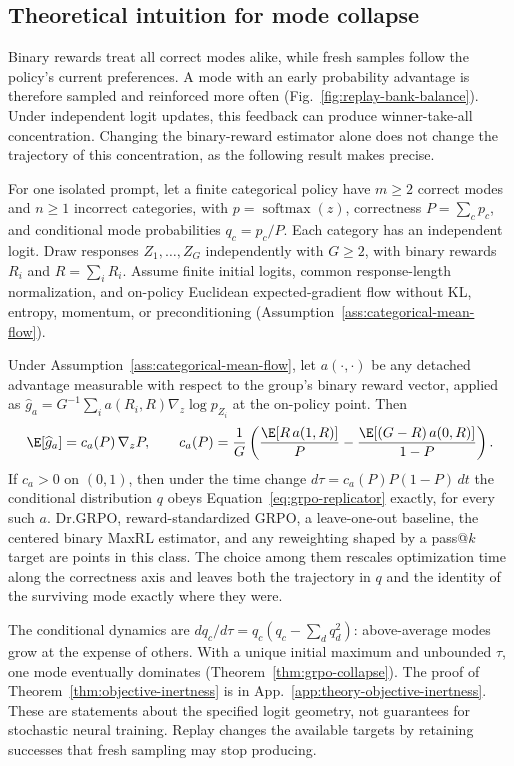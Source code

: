 \subsection{Theoretical intuition for mode collapse}
\label{sec:collapse-mechanism}

Binary rewards treat all correct modes alike, while fresh samples follow the policy's current preferences. A mode with an early probability advantage is therefore sampled and reinforced more often (Fig.~\ref{fig:replay-bank-balance}). Under independent logit updates, this feedback can produce winner-take-all concentration. Changing the binary-reward estimator alone does not change the trajectory of this concentration, as the following result makes precise.

For one isolated prompt, let a finite categorical policy have $m\ge2$ correct modes and $n\ge1$ incorrect categories, with $p=\operatorname{softmax}(z)$, correctness $P=\sum_c p_c$, and conditional mode probabilities $q_c=p_c/P$. Each category has an independent logit. Draw responses $Z_1,\ldots,Z_G$ independently with $G\ge2$, with binary rewards $R_i$ and $R=\sum_iR_i$. Assume finite initial logits, common response-length normalization, and on-policy Euclidean expected-gradient flow without KL, entropy, momentum, or preconditioning (Assumption~\ref{ass:categorical-mean-flow}).

\begin{theorem}
\label{thm:objective-inertness}
Under Assumption~\ref{ass:categorical-mean-flow}, let $a(\cdot,\cdot)$ be any
detached advantage measurable with respect to the group's binary reward
vector, applied as
$\widehat g_a=G^{-1}\sum_{i}a(R_i,R)\nabla_z\log p_{Z_i}$ at the on-policy
point. Then
\begin{equation}
  \E[\widehat g_a]=c_a(P)\,\nabla_zP,
  \qquad
  c_a(P)=\frac1G\left(
  \frac{\E[R\,a(1,R)]}{P}-\frac{\E[(G-R)\,a(0,R)]}{1-P}\right).
  \label{eq:objective-inertness}
\end{equation}
If $c_a>0$ on $(0,1)$, then under the time change
$d\tau=c_a(P)P(1-P)\,dt$ the conditional distribution $q$ obeys
Equation~\eqref{eq:grpo-replicator} exactly, for every such $a$. Dr.GRPO,
reward-standardized GRPO, a leave-one-out baseline, the centered binary MaxRL
estimator, and any reweighting shaped by a pass@$k$ target are points in this
class. The choice among them rescales optimization time along the correctness
axis and leaves both the trajectory in $q$ and the identity of the surviving
mode exactly where they were.
\end{theorem}

The conditional dynamics are $dq_c/d\tau=q_c(q_c-\sum_dq_d^2)$: above-average modes grow at the expense of others. With a unique initial maximum and unbounded $\tau$, one mode eventually dominates (Theorem~\ref{thm:grpo-collapse}). The proof of Theorem~\ref{thm:objective-inertness} is in App.~\ref{app:theory-objective-inertness}. These are statements about the specified logit geometry, not guarantees for stochastic neural training. Replay changes the available targets by retaining successes that fresh sampling may stop producing.


